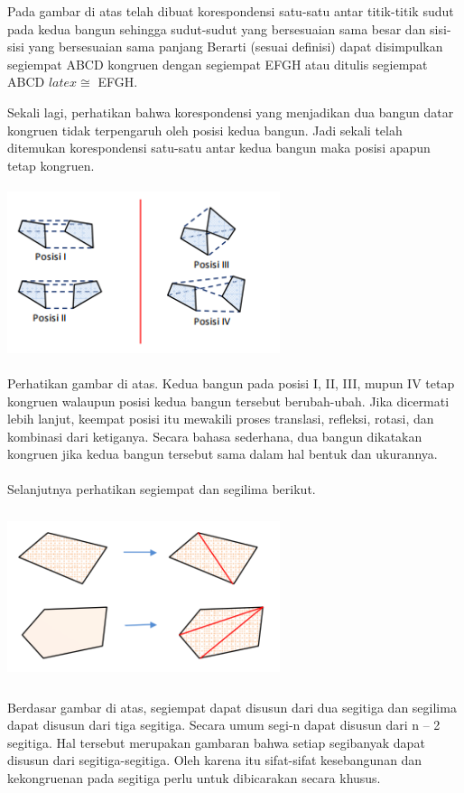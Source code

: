 \documentclass[11pt,fleqn]{book} %
\begin{document}
Pada gambar di atas telah dibuat korespondensi satu-satu antar titik-titik sudut pada kedua bangun sehingga sudut-sudut yang bersesuaian sama besar dan sisi-sisi yang bersesuaian sama panjang Berarti (sesuai definisi) dapat disimpulkan segiempat
ABCD kongruen dengan segiempat EFGH atau ditulis segiempat ABCD $latex\cong $ EFGH.

Sekali lagi, perhatikan bahwa korespondensi yang menjadikan dua bangun datar kongruen tidak terpengaruh oleh posisi kedua bangun. Jadi sekali telah ditemukan korespondensi satu-satu antar kedua bangun maka posisi apapun tetap kongruen. 

\includegraphics[width = 8cm, height= 5cm]{Pictures/2.png}

Perhatikan gambar di atas. Kedua bangun pada posisi I, II, III, mupun IV tetap
kongruen walaupun posisi kedua bangun tersebut berubah-ubah. Jika dicermati lebih
lanjut, keempat posisi itu mewakili proses translasi, refleksi, rotasi, dan kombinasi
dari ketiganya. Secara bahasa sederhana, dua bangun dikatakan kongruen jika kedua
bangun tersebut sama dalam hal bentuk dan ukurannya. 

\paragraph{}


Selanjutnya perhatikan segiempat dan segilima berikut. 

\includegraphics[width = 8cm, height= 5cm]{Pictures/3.png}

Berdasar gambar di atas, segiempat dapat disusun dari dua segitiga dan segilima
dapat disusun dari tiga segitiga. Secara umum segi-n dapat disusun dari n – 2 segitiga.
Hal tersebut merupakan gambaran bahwa setiap segibanyak dapat disusun dari segitiga-segitiga. Oleh karena itu sifat-sifat kesebangunan dan kekongruenan pada
segitiga perlu untuk dibicarakan secara khusus. 
\end{document}
